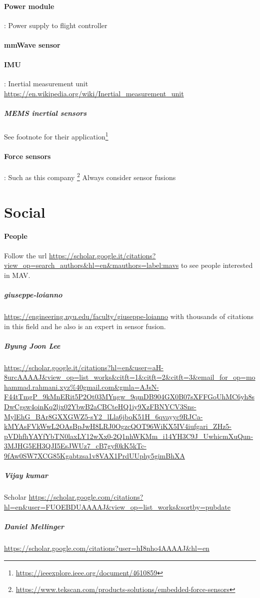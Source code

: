 \documentclass{article}
\begin{document}
			\paragraph{Power module}: Power supply to flight controller
			\paragraph{mmWave sensor}
			\paragraph{IMU}: Inertial measurement unit \url{https://en.wikipedia.org/wiki/Inertial_measurement_unit}
				\subparagraph{MEMS inertial sensors}
				See footnote for their application\footnote{\url{https://ieeexplore.ieee.org/document/4610859}}
			\paragraph{Force sensors}: Such as this company \footnote{\url{https://www.tekscan.com/products-solutions/embedded-force-sensors}}
		Always consider sensor fusions
	\section{Social}
		\paragraph{People}
		Follow the url \url{https://scholar.google.it/citations?view_op=search_authors\&hl=en\&mauthors=label:mavs} to see people interested in MAV. 
			\subparagraph{giuseppe-loianno} \url{https://engineering.nyu.edu/faculty/giuseppe-loianno} with thousands of citations in this field and he also is an expert in sensor fusion.
			\subparagraph{Byung Joon Lee} \url{https://scholar.google.it/citations?hl=en\&user=aH-8urcAAAAJ\&view_op=list_works\&citft=1\&citft=2\&citft=3\&email_for_op=mohammad.rahmani.xyz%40gmail.com&gmla=AJsN-F44tTmgP_9kMnERit5P2Ot03MYngw_9qmDB904GX0B07sXFFGoUhMC6yh8sDwCgsw4oinKq2ljx02YbwB2aCBCteHQ1iy9XzFBNYCV3Sns-MylEhG_BAr8GXXGWZ5-sY2_lLla6jboK51H_6qvayyc9RJCa-kMYAsFVkWwL2OAsBpJwH8LRJ0OgzcQOT96WiKX5IV4iufgari_ZHz5-pVDhfhYAYfYbTN0laxLY12wXx0-2Q1nhWKMm_i14YH3C9J_UwhicmXuQun-3MJHG5EH3QJI5EsJWUz7_cB7gyf0kK5kTc-9fAw0SW7XCG85Kgabtzsa1v8VAX1PrdUUphy5gimBhXA}
				
			\subparagraph{Vijay kumar} Scholar \url{https://scholar.google.com/citations?hl=en\&user=FUOEBDUAAAAJ\&view_op=list_works\&sortby=pubdate}
			
			\subparagraph{Daniel Mellinger}
			\url{https://scholar.google.com/citations?user=hI8nho4AAAAJ\&hl=en}
	
\end{document}

